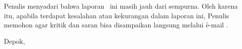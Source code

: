 Penulis menyadari bahwa laporan \type~ini masih jauh dari sempurna. Oleh karena itu, apabila terdapat kesalahan atau kekurangan dalam laporan ini, Penulis memohon agar kritik dan saran bisa disampaikan langsung melalui \f{e-mail} .

\vspace*{0.1cm}
\begin{flushright}
Depok, \tanggalSiapSidang\\[0.1cm]
\vspace*{1cm}
\penulis

\end{flushright}
